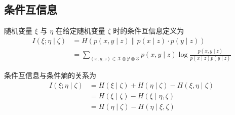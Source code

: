 \subsection{条件互信息}
\begin{definition}
    随机变量 $ \xi $ 与 $ \eta $ 在给定随机变量 $ \zeta $ 时的条件互信息定义为
$$
\begin{aligned}
I(\xi ; \eta \mid \zeta) & =H(p(x, y \mid z) \| p(x \mid z) \cdot p(y \mid z)) \\
& =\sum_{(x, y, z) \in \mathscr{X} \otimes \mathscr{Y} \otimes \mathscr{Z}} p(x, y \mid z) \log \frac{p(x, y \mid z)}{p(x \mid z) p(y \mid z)}
\end{aligned}
$$
\end{definition}

条件互信息与条件熵的关系为
$$
\begin{aligned}
I(\xi ; \eta \mid \zeta) & =H(\xi \mid \zeta)+H(\eta \mid \zeta)-H(\xi, \eta \mid \zeta) \\
& =H(\xi \mid \zeta)-H(\xi \mid \eta, \zeta) \\
& =H(\eta \mid \zeta)-H(\eta \mid \xi, \zeta)
\end{aligned}
$$

